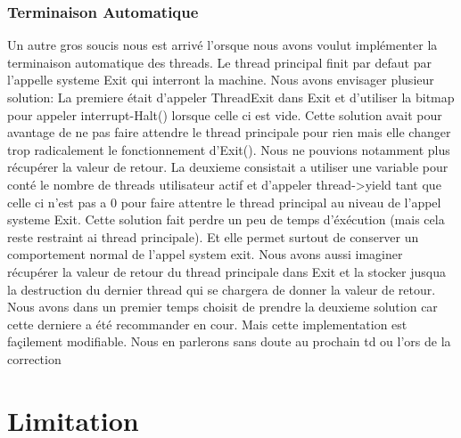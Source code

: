 \documentclass[10pt]{article}
\begin{document}
\subsubsection{Terminaison Automatique}
Un autre gros soucis nous est arrivé l'orsque nous avons voulut implémenter la terminaison
automatique des threads. Le thread principal finit par defaut par l'appelle systeme Exit
qui interront la machine.
Nous avons envisager plusieur solution:
\newline
\newline
La premiere était d'appeler ThreadExit dans Exit et d'utiliser la bitmap pour appeler interrupt-Halt()
lorsque celle ci est vide. Cette solution avait pour avantage de ne pas faire attendre le thread principale
pour rien mais elle changer trop radicalement le fonctionnement d'Exit(). Nous ne pouvions notamment
plus récupérer la valeur de retour.
\newline
La deuxieme consistait a utiliser une variable pour conté le nombre de threads utilisateur actif
et d'appeler thread->yield tant que celle ci n'est pas a 0 pour faire attentre le thread principal
au niveau de l'appel systeme Exit. Cette solution fait perdre un peu de temps d'éxécution (mais cela reste restraint
ai thread principale). Et elle permet surtout de conserver un comportement normal de l'appel system exit.
\newline
Nous avons aussi imaginer récupérer la valeur de retour du thread principale dans Exit et la stocker jusqua
la destruction du dernier thread qui se chargera de donner la valeur de retour.
\newline
\newline
Nous avons dans un premier temps choisit de prendre la deuxieme solution car cette derniere a été
recommander en cour. Mais cette implementation est façilement modifiable. Nous en parlerons sans doute
au prochain td ou l'ors de la correction

\section{Limitation}
\end{document}
